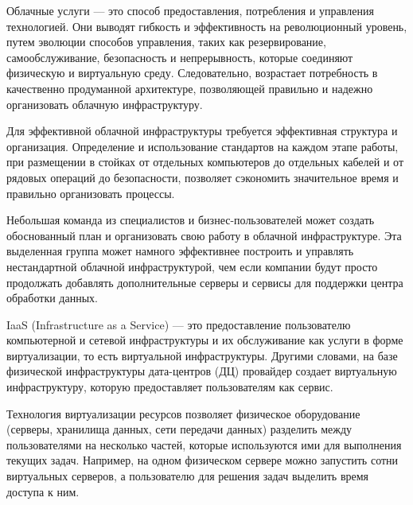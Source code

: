 
Облачные услуги --- это способ предоставления, потребления и управления технологией.
Они выводят гибкость и эффективность на революционный уровень, путем эволюции способов управления, таких как резервирование, самообслуживание, безопасность и непрерывность, которые соединяют физическую и виртуальную среду.
Следовательно, возрастает потребность в качественно продуманной архитектуре, позволяющей правильно и надежно организовать облачную инфраструктуру.

Для эффективной облачной инфраструктуры требуется эффективная структура и организация.
Определение и использование стандартов на каждом этапе работы, при размещении в стойках от отдельных компьютеров до отдельных кабелей и от рядовых операций до безопасности, позволяет сэкономить значительное время и правильно организовать процессы.

Небольшая команда из специалистов и бизнес-пользователей может создать обоснованный план и организовать свою работу в облачной инфраструктуре.
Эта выделенная группа может намного эффективнее построить и управлять нестандартной облачной инфраструктурой, чем если компании будут просто продолжать добавлять дополнительные серверы и сервисы для поддержки центра обработки данных.

IaaS (Infrastructure as a Service) --- это предоставление пользователю компьютерной и сетевой инфраструктуры и их обслуживание как услуги в форме виртуализации, то есть виртуальной инфраструктуры.
Другими словами, на базе физической инфраструктуры дата-центров (ДЦ) провайдер создает виртуальную инфраструктуру, которую предоставляет пользователям как сервис.

Технология виртуализации ресурсов позволяет физическое оборудование (серверы, хранилища данных, сети передачи данных) разделить между пользователями на несколько частей, которые используются ими для выполнения текущих задач.
Например, на одном физическом сервере можно запустить сотни виртуальных серверов, а пользователю для решения задач выделить время доступа к ним.

\clearpage
